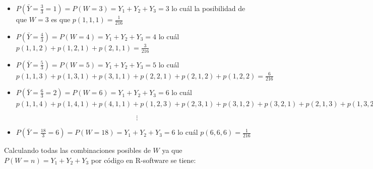 \documentclass[
]{article}
\begin{document}
\begin{itemize}
  
  \item $\displaystyle P(\bar{Y} = \frac{3}{3} = 1) = P(W = 3) = Y_{1} + Y_{2} + Y_{3} = 3$  lo cuál la posibilidad de que $W = 3$ es que $\displaystyle p(1,1,1) = \frac{1}{216}$
  
  \item $\displaystyle P(\bar{Y} = \frac{4}{3}) = P(W = 4) = Y_{1} + Y_{2} + Y_{3} = 4$  lo cuál $\displaystyle p(1,1,2) + p(1,2,1) + p(2,1,1)  = \frac{3}{216}$
  
  \item $\displaystyle P(\bar{Y} = \frac{5}{3}) = P(W = 5) = Y_{1} + Y_{2} + Y_{3} = 5$  lo cuál $\displaystyle p(1,1,3) + p(1,3,1) + p(3,1,1) + p(2,2,1) + p(2,1,2) + p(1,2,2)  = \frac{6}{216}$
  
  \item $\displaystyle P(\bar{Y} = \frac{6}{3} = 2) = P(W = 6) = Y_{1} + Y_{2} + Y_{3} = 6$  lo cuál $\displaystyle p(1,1,4) + p(1,4,1) + p(4,1,1) + p(1,2,3) + p(2,3,1) + p(3,1,2) + p(3,2,1) +p(2,1,3) + p(1,3,2)  + p(2,2,2) = \frac{10}{216}$
 
    $$ \displaystyle  \vdots $$ 
       
  \item $\displaystyle P(\bar{Y} = \frac{18}{3} = 6) = P(W = 18) = Y_{1} + Y_{2} + Y_{3} = 6$  lo cuál $\displaystyle p(6,6,6) = \frac{1}{216}$
       
\end{itemize}

Calculando todas las combinaciones posibles de $W$ ya que $P(W=n)=Y_{1}+Y_{2}+Y_{3}$ por código en R-software se tiene:
\end{document}
